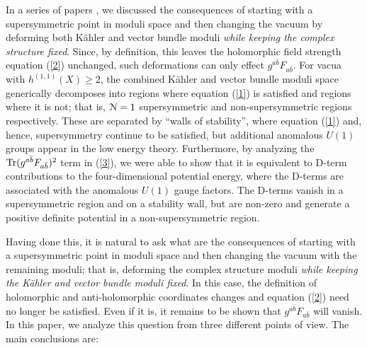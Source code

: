 \documentclass[12pt]{article}
\numberwithin{equation}{section}
\begin{document}
 In a series of papers \cite{Anderson:2009sw,Anderson:2009nt,Anderson:2010tc,Sharpe:1998zu}, we discussed the consequences of starting with a supersymmetric point in moduli space and then changing the vacuum by deforming both K\"ahler and vector bundle moduli {\it while keeping the complex structure fixed}. Since, by definition, this leaves the holomorphic field strength equation (\ref{2}) unchanged, such deformations can only effect $g^{a\bar{b}}F_{a{\bar{b}}}$. For vacua with $h^{(1,1)}(X)\geq 2$, the combined K\"ahler and vector bundle moduli space generically decomposes into regions where equation (\ref{1}) is satisfied and regions where it  is not; that is, ${\cal{N}}=1$ supersymmetric and non-supersymmetric regions respectively. These are separated by ``walls of stability'', where equation (\ref{1}) and, hence, supersymmetry continue to be satisfied, but additional anomalous $U(1)$ groups appear in the low energy theory. Furthermore, by analyzing the
 $\textnormal{Tr}(g^{a{\bar{b}}} F_{a{\bar{b}}})^{2}$ term in (\ref{3}), we were able to show that it is equivalent to D-term contributions to the four-dimensional potential energy, where the D-terms are 
associated with the anomalous $U(1)$ gauge factors.  
The D-terms vanish in a supersymmetric region and on a stability wall, but are non-zero and generate a positive definite potential in a non-supersymmetric region. 

Having done this, it is natural to ask what are the consequences of starting with a supersymmetric point in moduli space and then changing the vacuum with the remaining moduli; that is, deforming the complex structure moduli {\it while keeping the K\"ahler and vector bundle moduli fixed}. In this case, the definition of holomorphic and anti-holomorphic coordinates changes and equation (\ref{2}) need no longer be satisfied. Even if it is, it remains to be shown that $g^{a{\bar{b}}} F_{a{\bar{b}}}$ will vanish. In this paper, we analyze this question from three different points of view. The main conclusions are: 
\end{document}
